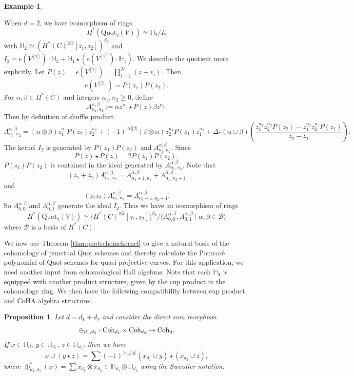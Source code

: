 \documentclass[10pt]{amsart}
\newcommand{\BH}{\mathbb{H}}
\newcommand{\CB}{\mathcal{B}}
\newcommand{\Coh}{\textnormal{Coh}}
\newcommand{\+}{{}^+}
\newtheorem {proposition}[theorem]{Proposition}
\theoremstyle{definition}
\newtheorem {example}[theorem]{Example}
\theoremstyle {definition}
\theoremstyle {definition}
\begin{document}
\begin{example} \label{ex: d=2 ring}

When $d=2$, we have isomorphism of rings \[ H^*(\mathrm{Quot}_2(V)) \simeq \BH_2/I_2\] with $\mathbb{H}_2 \simeq (H^*(C)^{\otimes 2}[z_1,z_2])^{S_2}$ and $I_2= e(V^{[2]}) \cdot \mathbb{H}_2+ \mathbb{H}_1 \star (e(V^{[1]}) \cdot \BH_1). $ We describe the quotient more explicitly. Let $P(z) = e(V^{[1]}) = \prod_{i=1}^N (z-v_i)$. Then \[ e(V^{[2]})=P(z_1)P(z_2).\]
For $\alpha,\beta \in H^*(C)$ and integers $n_1,n_2 \geq 0$, define \[ A^{\alpha,\beta}_{n_1,n_2} := \alpha z^{n_1} \star P(z) \beta z^{n_2}. \] Then by definition of shuffle product
\[ A^{\alpha,\beta}_{n_1,n_2}= (\alpha \otimes \beta) z_1^{n_1} P(z_2)z_2^{n_2}+(-1)^{|\alpha||\beta|}(\beta\otimes\alpha)z_2^{n_1} P(z_1)z_1^{n_2}+\Delta_*(\alpha\cup\beta)\left( \frac{z_1^{n_1}z_2^{n_2}P(z_2)-z_1^{n_2}z_2^{n_1}P(z_1)}{z_2-z_1}\right). \] The kernel $I_2$ is generated by $P(z_1)P(z_2)$ and $A^{\alpha,\beta}_{n_1,n_2}$. Since \[ P(z) \star P(z) = 2P(z_1)P(z_2),\] $P(z_1)P(z_2)$ is contained in the ideal generated by $A^{\alpha,\beta}_{n_1,n_2}$. Note that\[ (z_1+z_2) A^{\alpha,\beta}_{n_1,n_2} =  A^{\alpha,\beta}_{n_1+1,n_2} +  A^{\alpha,\beta}_{n_1,n_2+1}\] and \[ (z_1z_2) A^{\alpha,\beta}_{n_1,n_2}= A^{\alpha,\beta}_{n_1+1,n_2+1}.\] So $A^{\alpha,\beta}_{0,0}$ and $A^{\alpha,\beta}_{0,1}$ generate the ideal $I_2$. Thus we have an isomorphism of rings \[ H^*(\mathrm{Quot}_2(V)) \simeq \big(H^*(C)^{\otimes 2}[z_1,z_2]\big)^{S_2}/\langle A^{\alpha,\beta}_{0,0}, A^{\alpha,\beta}_{0,1} \mid \alpha,\beta \in \CB \rangle\]
where $\CB$ is a basis of $H^*(C)$. 
\end{example}




We now use Theorem \ref{thm:quotschemekernel} to give a natural basis of the cohomology of punctual Quot schemes and thereby calculate the Poincar\'e polynomial of Quot schemes for quasi-projective curves. For this application, we need another input from cohomological Hall algebras. Note that each $\mathbb{H}_d$ is equipped with another product structure, given by the cup product in the cohomology ring. We then have the following compatibility between cup product and CoHA algebra structure:

\begin{proposition} \label{CoHAcupcompatibility}
    Let $d=d_1+d_2$ and consider the direct sum morphism
\[ \oplus_{d_1,d_2}: \Coh_{d_1} \times \Coh_{d_2} \rightarrow \Coh_{d}. \]
    If $x\in \BH_d,\ y\in \BH_{d_1},\ z\in \BH_{d_2}$, then we have 
    $$x\cup(y\star z)=\sum (-1)^{|x_{d_2}||y|}(x_{d_1}\cup y)\star (x_{d_2}\cup z),
    $$
    where $\oplus_{d_1,d_2}^*(x)=\sum x_{d_1}\otimes x_{d_2}\in \BH_{d_1}\otimes \BH_{d_2}$ using the Sweedler notation. 


\end{proposition}
\end{document}

